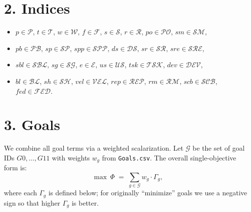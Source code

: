\documentclass[11pt,a4paper]{article}
\begin{document}
\section{2. Indices}
\begin{itemize}[leftmargin=2em]
  \item $p\in\mathcal{P}$,\; $t\in\mathcal{T}$,\; $w\in\mathcal{W}$,\; $f\in\mathcal{F}$,\; $s\in\mathcal{S}$,\; $r\in\mathcal{R}$,\; $po\in\mathcal{PO}$,\; $sm\in\mathcal{SM}$,
  \item $pb\in\mathcal{PB}$,\; $sp\in\mathcal{SP}$,\; $spp\in\mathcal{SPP}$,\; $ds\in\mathcal{DS}$,\; $sr\in\mathcal{SR}$,\; $sre\in\mathcal{SRE}$,
  \item $sbl\in\mathcal{SBL}$,\; $sg\in\mathcal{SG}$,\; $e\in\mathcal{E}$,\; $us\in\mathcal{US}$,\; $tsk\in\mathcal{TSK}$,\; $dev\in\mathcal{DEV}$,
  \item $bl\in\mathcal{BL}$,\; $sh\in\mathcal{SH}$,\; $vel\in\mathcal{VEL}$,\; $rep\in\mathcal{REP}$,\; $rm\in\mathcal{RM}$,\; $scb\in\mathcal{SCB}$,\; $fed\in\mathcal{FED}$.
\end{itemize}

\section{3. Goals}
\noindent We combine all goal terms via a weighted scalarization. Let $\mathcal{G}$ be the set of goal IDs $G0,\dots,G11$ with weights $w_g$ from \texttt{Goals.csv}. The overall single-objective form is:
\[
\max \ \Phi \;=\; \sum_{g\in\mathcal{G}} w_g \cdot \Gamma_g,
\]
where each $\Gamma_g$ is defined below; for originally ``minimize'' goals we use a negative sign so that higher $\Gamma_g$ is better.
\end{document}
